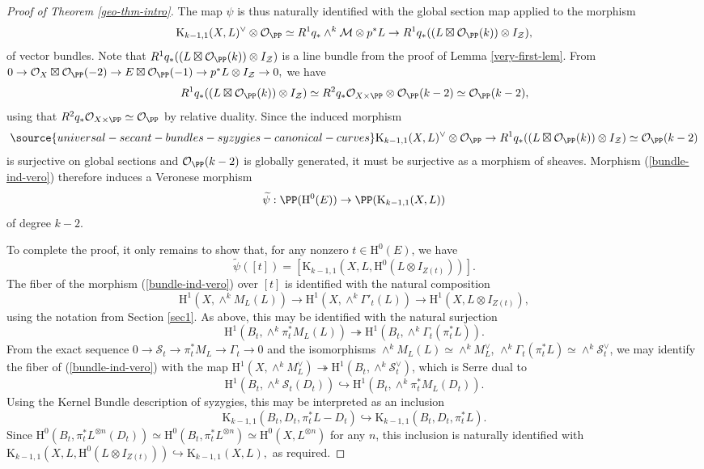 \begin{proof}[Proof of Theorem \ref{geo-thm-intro}]
The map $\psi$ is thus naturally identified with the global section map applied to the morphism
$$\mathrm{K}_{k-1,1}(X,L)^{\vee} \otimes \mathcal{O}_{\PP} \simeq R^1q_*\wedge^k\mathcal{M} \otimes p^*L \to R^1 q_*((L \boxtimes \mathcal{O}_{\PP}(k))\otimes I_{\mathcal{Z}}),$$
of vector bundles. Note that $R^1 q_*((L \boxtimes \mathcal{O}_{\PP}(k))\otimes I_{\mathcal{Z}})$ is a line bundle from the proof of Lemma \ref{very-first-lem}. From
$0 \to \mathcal{O}_X \boxtimes \mathcal{O}_{\PP}(-2) \to E \boxtimes \mathcal{O}_{\PP}(-1) \to p^*L \otimes  I_{\mathcal{Z}} \to 0,$
we have $$R^1 q_*((L \boxtimes \mathcal{O}_{\PP}(k))\otimes I_{\mathcal{Z}}) \simeq R^2q_*\mathcal{O}_{X \times \PP} \otimes \mathcal{O}_{\PP}(k-2)\simeq \mathcal{O}_{\PP}(k-2),$$
using that $R^2q_*\mathcal{O}_{X \times \PP} \simeq \mathcal{O}_{\PP}$ by relative duality. Since the induced morphism
\begin{align} \label{bundle-ind-vero}
\source{universal-secant-bundles-syzygies-canonical-curves}
\mathrm{K}_{k-1,1}(X,L)^{\vee} \otimes \mathcal{O}_{\PP} \to R^1 q_*((L \boxtimes \mathcal{O}_{\PP}(k))\otimes I_{\mathcal{Z}}) \simeq \mathcal{O}_{\PP}(k-2)
\end{align}
is surjective on global sections and $\mathcal{O}_{\PP}(k-2)$ is globally generated, it must be surjective as a morphism of sheaves. Morphism (\ref{bundle-ind-vero}) therefore induces a Veronese morphism $$\widetilde{\psi} : \PP(\mathrm{H}^0(E)) \to \PP(\mathrm{K}_{k-1,1}(X,L))$$ of degree $k-2$.

To complete the proof, it only remains to show that, for any nonzero $t \in \mathrm{H}^0(E)$, we have
$$\widetilde{\psi}([t])=[\mathrm{K}_{k-1,1}\left(X,L,\mathrm{H}^0(L \otimes I_{Z(t)})\right)].$$
The fiber of the morphism (\ref{bundle-ind-vero}) over $[t]$ is identified with the natural composition
$$\mathrm{H}^1(X,\wedge^k M_L(L)) \to \mathrm{H}^1(X,\wedge^k \Gamma'_t(L)) \to \mathrm{H}^1(X,L \otimes I_{Z(t)}),$$
using the notation from Section \ref{sec1}. As above, this may be identified with the natural surjection
$$\mathrm{H}^1(B_t,\wedge^k \pi^*_tM_L(L)) \twoheadrightarrow \mathrm{H}^1(B_t,\wedge^k \Gamma_t (\pi^*_t L )).$$
From the exact sequence $0 \to \mathcal{S}_t \to \pi_t^* M_L \to \Gamma_t \to 0$ and the isomorphisms $\wedge^k M_L(L) \simeq \wedge^k M_L^{\vee}$, $\wedge^k \Gamma_t (\pi^*_t L) \simeq \wedge^k \mathcal{S}_t^{\vee}$, we may identify the fiber of (\ref{bundle-ind-vero}) with the map $\mathrm{H}^1(X,\wedge^k M_L^{\vee}) \twoheadrightarrow \mathrm{H}^1(B_t, \wedge^k \mathcal{S}_t^{\vee})$, which is Serre dual to
$$ \mathrm{H}^1(B_t, \wedge^k \mathcal{S}_t(D_t)) \hookrightarrow \mathrm{H}^1(B_t,\wedge^k \pi_t^* M_L(D_t)). $$ Using the Kernel Bundle description of syzygies, this may be interpreted as an inclusion
$$\mathrm{K}_{k-1,1}(B_t,D_t, \pi_t^*L-D_t)\hookrightarrow \mathrm{K}_{k-1,1}(B_t,D_t,\pi_t^*L).$$
Since $\mathrm{H}^0(B_t, \pi_t^*L^{\otimes n}(D_t)) \simeq \mathrm{H}^0(B_t, \pi_t^*L^{\otimes n})\simeq \mathrm{H}^0(X, L^{\otimes n})$ for any $n$,
this inclusion is naturally identified with $\mathrm{K}_{k-1,1}\left(X,L,\mathrm{H}^0(L \otimes I_{Z(t)})\right) \hookrightarrow \mathrm{K}_{k-1,1}(X,L),$
as required.
\end{proof}

